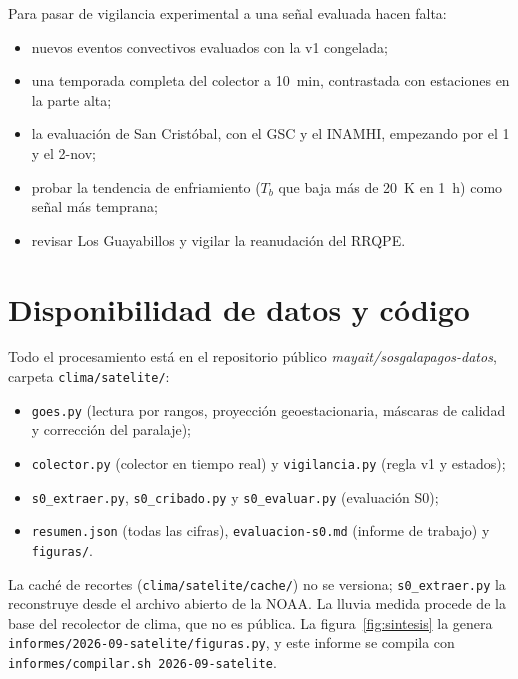 \documentclass{sosg-informe}
\begin{document}
Para pasar de vigilancia experimental a una señal evaluada hacen falta:
\begin{itemize}
  \item nuevos eventos convectivos evaluados con la v1 congelada;
  \item una temporada completa del colector a 10~min, contrastada con estaciones en la parte alta;
  \item la evaluación de San Cristóbal, con el GSC y el INAMHI, empezando por el 1 y el 2-nov;
  \item probar la tendencia de enfriamiento ($T_b$ que baja más de 20~K en 1~h) como señal más temprana;
  \item revisar Los Guayabillos y vigilar la reanudación del RRQPE.
\end{itemize}

\section*{Disponibilidad de datos y código}
{\small Todo el procesamiento está en el repositorio público \emph{mayait/sosgalapagos-datos}, carpeta \texttt{clima/satelite/}:
\begin{itemize}
  \item \texttt{goes.py} (lectura por rangos, proyección geoestacionaria, máscaras de calidad y corrección del paralaje);
  \item \texttt{colector.py} (colector en tiempo real) y \texttt{vigilancia.py} (regla v1 y estados);
  \item \texttt{s0\_extraer.py}, \texttt{s0\_cribado.py} y \texttt{s0\_evaluar.py} (evaluación S0);
  \item \texttt{resumen.json} (todas las cifras), \texttt{evaluacion-s0.md} (informe de trabajo) y \texttt{figuras/}.
\end{itemize}
La caché de recortes (\texttt{clima/satelite/cache/}) no se versiona; \texttt{s0\_extraer.py} la reconstruye desde el archivo abierto de la NOAA. La lluvia medida procede de la base del recolector de clima, que no es pública. La figura~\ref{fig:sintesis} la genera \texttt{informes/2026-09-satelite/figuras.py}, y este informe se compila con \texttt{informes/compilar.sh 2026-09-satelite}.\par}



\end{document}
